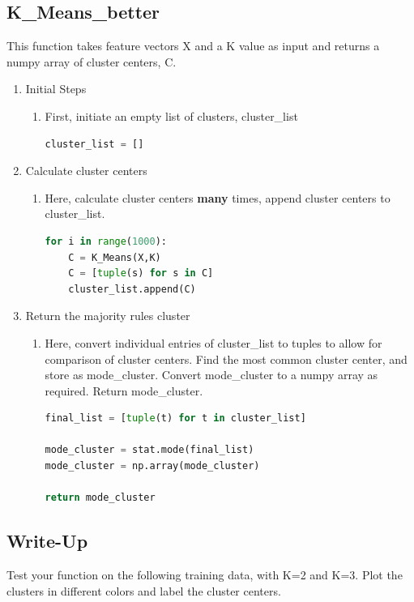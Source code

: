 \documentclass[11pt]{article}
\theoremstyle{definition}
\begin{document}
\subsection{K\_Means\_better}
This function takes feature vectors \textsf{X} and a \textsf{K} value as input and returns a numpy array of cluster centers, \textsf{C}.
\begin{enumerate}
    \item Initial Steps
    \begin{enumerate}
        \item First, initiate an empty list of clusters, \textsf{cluster\_list}
\begin{lstlisting}[language=python, frame=single]
cluster_list = []
\end{lstlisting}
    \end{enumerate}
    \item Calculate cluster centers
    \begin{enumerate}
        \item Here, calculate cluster centers \textbf{many} times, append cluster centers to \textsf{cluster\_list}.
\begin{lstlisting}[language=python, frame=single]
for i in range(1000):
    C = K_Means(X,K)
    C = [tuple(s) for s in C]
    cluster_list.append(C)
\end{lstlisting}
    \end{enumerate}
    \item Return the majority rules cluster
    \begin{enumerate}
        \item Here, convert individual entries of \textsf{cluster\_list} to tuples to allow for comparison of cluster centers. Find the most common cluster center, and store as \textsf{mode\_cluster}. Convert \textsf{mode\_cluster} to a numpy array as required. Return \textsf{mode\_cluster}.
\begin{lstlisting}[language=python, frame=single]
final_list = [tuple(t) for t in cluster_list]

mode_cluster = stat.mode(final_list)
mode_cluster = np.array(mode_cluster)

return mode_cluster
\end{lstlisting}
    \end{enumerate}
\end{enumerate}

\clearpage
\subsection{Write-Up}
\begin{shaded}
Test your function on the following training data, with K=2 and K=3. Plot the clusters in different colors and label the cluster centers.
\end{shaded}
\end{document}
